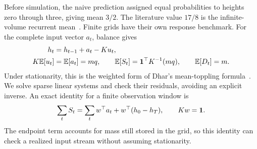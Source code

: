 Before simulation, the naive prediction assigned equal probabilities to heights zero through three, giving mean $3/2$. The literature value $17/8$ is the infinite-volume recurrent mean~\cite{levine2014}. Finite grids have their own response benchmark. For the complete input vector $a_t$, balance gives
\begin{align}
 h_t&=h_{t-1}+a_t-Ku_t,\\
 K\mathbb E[u_t]&=\mathbb E[a_t]=m q,\qquad
 \mathbb E[S_t]=\mathbf 1^\top K^{-1}(mq),\qquad \mathbb E[D_t]=m.\label{eq:benchmark}
\end{align}
Under stationarity, this is the weighted form of Dhar's mean-toppling formula~\cite[Theorem 2.18]{jarai2018}. We solve sparse linear systems and check their residuals, avoiding an explicit inverse. An exact identity for a finite observation window is
\begin{equation}
 \sum_t S_t=\sum_t w^\top a_t+w^\top(h_0-h_T),\qquad Kw=\mathbf 1.\label{eq:potentialbalance}
\end{equation}
The endpoint term accounts for mass still stored in the grid, so this identity can check a realized input stream without assuming stationarity.
